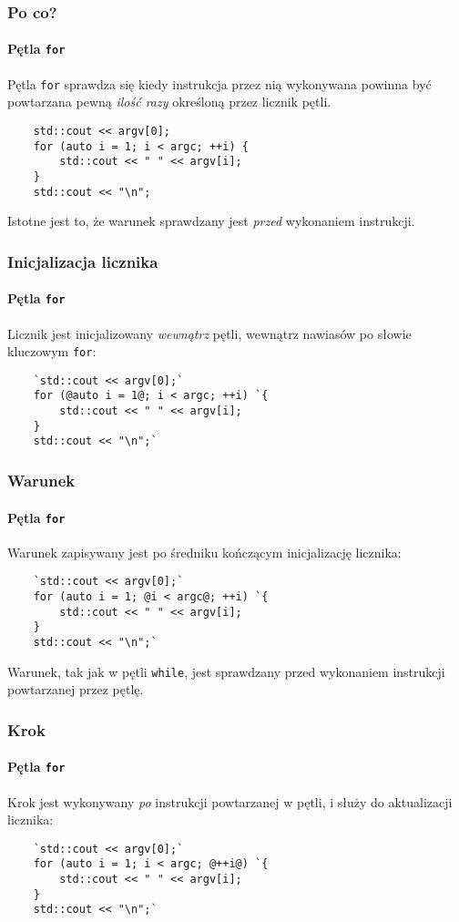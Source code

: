 \documentclass[aspectratio=169]{beamer}
\begin{document}
\begin{frame}[fragile]
    \frametitle{Po co?}
    \framesubtitle{Pętla {\tt for}}

    Pętla {\tt for} sprawdza się kiedy instrukcja przez nią wykonywana powinna
    być powtarzana pewną \emph{ilość razy} określoną przez licznik pętli.

    \begin{lstlisting}
    std::cout << argv[0];
    for (auto i = 1; i < argc; ++i) {
        std::cout << " " << argv[i];
    }
    std::cout << "\n";
    \end{lstlisting}

    Istotne jest to, że warunek sprawdzany jest \emph{przed} wykonaniem
    instrukcji.
\end{frame}

\begin{frame}[fragile]
    \frametitle{Inicjalizacja licznika}
    \framesubtitle{Pętla {\tt for}}

    Licznik jest inicjalizowany \emph{wewnątrz} pętli, wewnątrz nawiasów po
    słowie kluczowym {\tt for}:

    \begin{lstlisting}
    `std::cout << argv[0];`
    for (@auto i = 1@; i < argc; ++i) `{
        std::cout << " " << argv[i];
    }
    std::cout << "\n";`
    \end{lstlisting}
\end{frame}

\begin{frame}[fragile]
    \frametitle{Warunek}
    \framesubtitle{Pętla {\tt for}}

    Warunek zapisywany jest po średniku kończącym inicjalizację licznika:

    \begin{lstlisting}
    `std::cout << argv[0];`
    for (auto i = 1; @i < argc@; ++i) `{
        std::cout << " " << argv[i];
    }
    std::cout << "\n";`
    \end{lstlisting}

    Warunek, tak jak w pętli {\tt while}, jest sprawdzany przed wykonaniem
    instrukcji powtarzanej przez pętlę.
\end{frame}

\begin{frame}[fragile]
    \frametitle{Krok}
    \framesubtitle{Pętla {\tt for}}

    Krok jest wykonywany \emph{po} instrukcji powtarzanej w pętli, i służy do
    aktualizacji licznika:

    \begin{lstlisting}
    `std::cout << argv[0];`
    for (auto i = 1; i < argc; @++i@) `{
        std::cout << " " << argv[i];
    }
    std::cout << "\n";`
    \end{lstlisting}
\end{frame}
\end{document}
